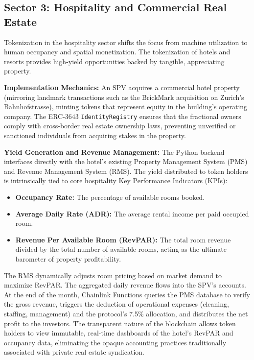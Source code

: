 \documentclass{Resources/bdlt-project}
\begin{document}
\subsection{Sector 3: Hospitality and Commercial Real Estate}
Tokenization in the hospitality sector shifts the focus from machine utilization to human occupancy and spatial monetization. The tokenization of hotels and resorts provides high-yield opportunities backed by tangible, appreciating property.

\textbf{Implementation Mechanics:}
An SPV acquires a commercial hotel property (mirroring landmark transactions such as the BrickMark acquisition on Zurich's Bahnhofstrasse), minting tokens that represent equity in the building's operating company. The ERC-3643 \texttt{IdentityRegistry} ensures that the fractional owners comply with cross-border real estate ownership laws, preventing unverified or sanctioned individuals from acquiring stakes in the property.

\textbf{Yield Generation and Revenue Management:}
The Python backend interfaces directly with the hotel's existing Property Management System (PMS) and Revenue Management System (RMS). The yield distributed to token holders is intrinsically tied to core hospitality Key Performance Indicators (KPIs):

\begin{itemize}
    \item \textbf{Occupancy Rate:} The percentage of available rooms booked.
    \item \textbf{Average Daily Rate (ADR):} The average rental income per paid occupied room.
    \item \textbf{Revenue Per Available Room (RevPAR):} The total room revenue divided by the total number of available rooms, acting as the ultimate barometer of property profitability.
\end{itemize}

The RMS dynamically adjusts room pricing based on market demand to maximize RevPAR. The aggregated daily revenue flows into the SPV's accounts. At the end of the month, Chainlink Functions queries the PMS database to verify the gross revenue, triggers the deduction of operational expenses (cleaning, staffing, management) and the protocol's 7.5\% allocation, and distributes the net profit to the investors. The transparent nature of the blockchain allows token holders to view immutable, real-time dashboards of the hotel's RevPAR and occupancy data, eliminating the opaque accounting practices traditionally associated with private real estate syndication.
\end{document}
